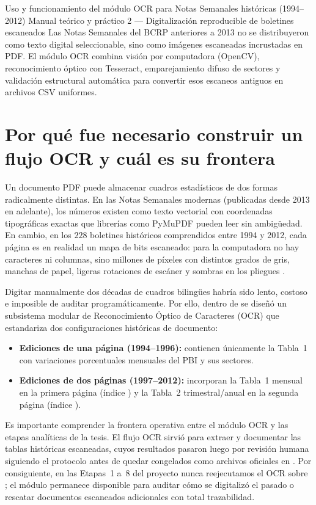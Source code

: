 \documentclass[12pt,letterpaper]{article}
\begin{document}
\apacabecera
  {Uso y funcionamiento del módulo OCR para Notas Semanales históricas (1994--2012)}
  {Manual teórico y práctico 2 — Digitalización reproducible de boletines escaneados}
  {Las Notas Semanales del BCRP anteriores a 2013 no se distribuyeron como texto digital seleccionable, sino como imágenes escaneadas incrustadas en PDF. El módulo OCR combina visión por computadora (OpenCV), reconocimiento óptico con Tesseract, emparejamiento difuso de sectores y validación estructural automática para convertir esos escaneos antiguos en archivos CSV uniformes.}

\section{Por qué fue necesario construir un flujo OCR y cuál es su frontera}

Un documento PDF puede almacenar cuadros estadísticos de dos formas radicalmente distintas. En las Notas Semanales modernas (publicadas desde 2013 en adelante), los números existen como texto vectorial con coordenadas tipográficas exactas que librerías como PyMuPDF pueden leer sin ambigüedad. En cambio, en los \(228\) boletines históricos comprendidos entre 1994 y 2012, cada página es en realidad un mapa de bits escaneado: para la computadora no hay caracteres ni columnas, sino millones de píxeles con distintos grados de gris, manchas de papel, ligeras rotaciones de escáner y sombras en los pliegues \parencite{cruz2025}.

Digitar manualmente dos décadas de cuadros bilingües habría sido lento, costoso e imposible de auditar programáticamente. Por ello, dentro de  se diseñó un subsistema modular de Reconocimiento Óptico de Caracteres (OCR) que estandariza dos configuraciones históricas de documento:
\begin{itemize}
  \item \textbf{Ediciones de una página (1994--1996):} contienen únicamente la Tabla~1 con variaciones porcentuales mensuales del PBI y sus sectores.
  \item \textbf{Ediciones de dos páginas (1997--2012):} incorporan la Tabla~1 mensual en la primera página (índice ) y la Tabla~2 trimestral/anual en la segunda página (índice ).
\end{itemize}

Es importante comprender la frontera operativa entre el módulo OCR y las etapas analíticas de la tesis. El flujo OCR sirvió para extraer y documentar las tablas históricas escaneadas, cuyos resultados pasaron luego por revisión humana siguiendo el protocolo  antes de quedar congelados como archivos oficiales en . Por consiguiente, en las Etapas~1 a~8 del proyecto nunca reejecutamos el OCR sobre ; el módulo permanece disponible para auditar cómo se digitalizó el pasado o rescatar documentos escaneados adicionales con total trazabilidad.
\end{document}
